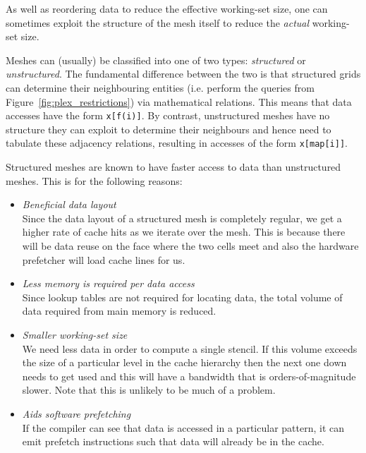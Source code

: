 As well as reordering data to reduce the effective working-set size, one can sometimes exploit the structure of the mesh itself to reduce the \textit{actual} working-set size.

Meshes can (usually) be classified into one of two types: \textit{structured} or \textit{unstructured}.
The fundamental difference between the two is that structured grids can determine their neighbouring entities (i.e. perform the queries from Figure~\ref{fig:plex_restrictions}) via mathematical relations.
This means that data accesses have the form \texttt{x[f(i)]}.
By contrast, unstructured meshes have no structure they can exploit to determine their neighbours and hence need to tabulate these adjacency relations, resulting in accesses of the form \texttt{x[map[i]]}.

Structured meshes are known to have faster access to data than unstructured meshes.
This is for the following reasons:

\begin{itemize}
  \item
    \textit{Beneficial data layout} \\
    Since the data layout of a structured mesh is completely regular, we get a higher rate of cache hits as we iterate over the mesh.
    This is because there will be data reuse on the face where the two cells meet and also the hardware prefetcher will load cache lines for us.

  \item
    \textit{Less memory is required per data access} \\
    Since lookup tables are not required for locating data, the total volume of data required from main memory is reduced.

  \item
    \textit{Smaller working-set size} \\
    We need less data in order to compute a single stencil.
    If this volume exceeds the size of a particular level in the cache hierarchy then the next one down needs to get used and this will have a bandwidth that is orders-of-magnitude slower.
    Note that this is unlikely to be much of a problem.

  \item
    \textit{Aids software prefetching} \\
    If the compiler can see that data is accessed in a particular pattern, it can emit prefetch instructions such that data will already be in the cache.
\end{itemize}

